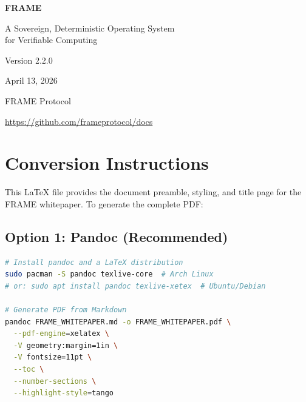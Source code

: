 \documentclass[11pt,a4paper]{article}
\begin{document}
\begin{titlepage}
\centering
\vspace*{3cm}
{\Huge\bfseries FRAME\par}
\vspace{0.5cm}
{\Large A Sovereign, Deterministic Operating System\\for Verifiable Computing\par}
\vspace{2cm}
{\large Version 2.2.0\par}
\vspace{0.5cm}
{\large April 13, 2026\par}
\vspace{2cm}
{\large FRAME Protocol\par}
\vspace{1cm}
{\small\url{https://github.com/frameprotocol/docs}\par}
\vfill
\end{titlepage}

\tableofcontents
\newpage

%
%

\section*{Conversion Instructions}

This \LaTeX{} file provides the document preamble, styling, and title page for the FRAME whitepaper. To generate the complete PDF:

\subsection*{Option 1: Pandoc (Recommended)}
\begin{lstlisting}[language=bash]
# Install pandoc and a LaTeX distribution
sudo pacman -S pandoc texlive-core  # Arch Linux
# or: sudo apt install pandoc texlive-xetex  # Ubuntu/Debian

# Generate PDF from Markdown
pandoc FRAME_WHITEPAPER.md -o FRAME_WHITEPAPER.pdf \
  --pdf-engine=xelatex \
  -V geometry:margin=1in \
  -V fontsize=11pt \
  --toc \
  --number-sections \
  --highlight-style=tango
\end{lstlisting}
\end{document}
